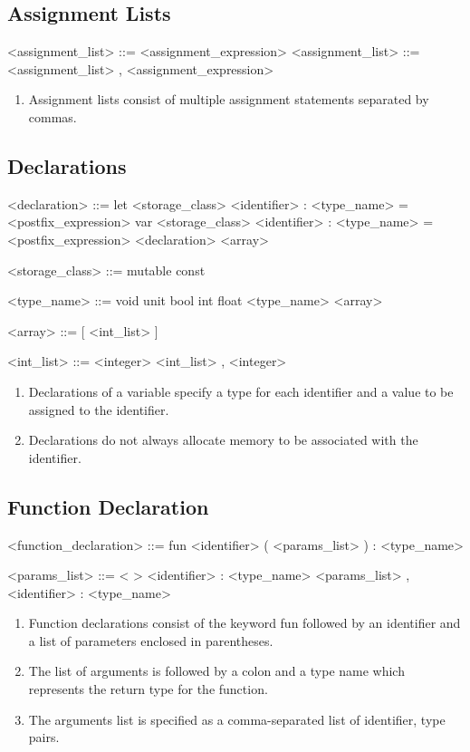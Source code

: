 \subsection{Assignment Lists}
\begin{grammar}
	<assignment_list> ::= <assignment_expression>
		\alt <assignment_list> ::= <assignment_list> , <assignment_expression> 
\end{grammar}
\begin{enumerate}
	\item Assignment lists consist of multiple assignment statements separated by commas.
\end{enumerate}

\subsection{Declarations}
\begin{grammar}
	<declaration> ::=  let <storage_class> <identifier> : <type_name> = <postfix_expression>
		\alt var <storage_class> <identifier> : <type_name> = <postfix_expression>
		\alt <declaration> <array>
	
	<storage_class> ::= mutable
		\alt const
	
	<type_name> ::= void
		\alt unit
		\alt bool
		\alt int
		\alt float
		\alt <type_name> <array>
		
	<array> ::= [ <int_list> ]
		\alt [ <array> ]
	
	<int_list> ::= <integer>
		\alt <int_list> , <integer>
\end{grammar}
\begin{enumerate}
	\item Declarations of a variable specify a type for each identifier and a value to be assigned to the identifier.
	\item Declarations do not always allocate memory to be associated with the identifier.
\end{enumerate}

\subsection{Function Declaration}
\begin{grammar}
	<function_declaration> ::= fun <identifier> ( <params_list> ) : <type_name>
	
	<params_list> ::= < > 
		\alt <identifier> : <type_name> 
		\alt <params_list> , <identifier> : <type_name>
\end{grammar}
\begin{enumerate}
	\item Function declarations consist of the keyword fun followed by an identifier and a list of parameters enclosed in parentheses.
	\item The list of arguments is followed by a colon and a type name which represents the return type for the function.
	\item The arguments list is specified as a comma-separated list of identifier, type pairs.
\end{enumerate}

